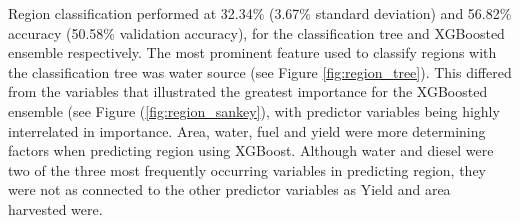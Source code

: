 \documentclass[review,12pt,authoryear]{elsarticle}
\begin{document}
\begin{linenumbers}
Region classification performed %
at 32.34\% (3.67\% standard deviation) and 56.82\% accuracy (50.58\% validation accuracy), for the classification tree and XGBoosted ensemble respectively. The most prominent feature used to classify regions with the classification tree was water source (see Figure \ref{fig:region_tree}). This differed from the variables that illustrated the greatest importance for the XGBoosted ensemble (see Figure (\ref{fig:region_sankey}), with predictor variables being highly interrelated in importance. 
Area, water, fuel and yield were more determining factors when predicting region using XGBoost. %
Although water and diesel were two of the three most frequently occurring variables in predicting region, they were not as connected to the other predictor variables as Yield and area harvested were.
\par


\end{linenumbers}
\end{document}
